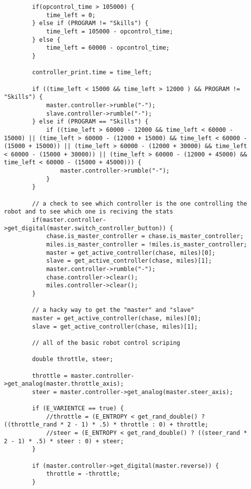 \begin{verbatim}
        if(opcontrol_time > 105000) {
            time_left = 0;
        } else if (PROGRAM != "Skills") {
            time_left = 105000 - opcontrol_time;
        } else {
            time_left = 60000 - opcontrol_time;
        }

        controller_print.time = time_left;

        if ((time_left < 15000 && time_left > 12000 ) && PROGRAM != "Skills") {
            master.controller->rumble("-");
            slave.controller->rumble("-");
        } else if (PROGRAM == "Skills") {
            if ((time_left > 60000 - 12000 && time_left < 60000 - 15000) || (time_left > 60000 - (12000 + 15000) && time_left < 60000 - (15000 + 15000)) || (time_left > 60000 - (12000 + 30000) && time_left < 60000 - (15000 + 30000)) || (time_left > 60000 - (12000 + 45000) && time_left < 60000 - (15000 + 45000))) {
                master.controller->rumble("-");
            }
        }

        // a check to see which controller is the one controlling the robot and to see which one is reciving the stats
        if(master.controller->get_digital(master.switch_controller_button)) {
            chase.is_master_controller = chase.is_master_controller;
            miles.is_master_controller = !miles.is_master_controller;
            master = get_active_controller(chase, miles)[0];
            slave = get_active_controller(chase, miles)[1];
            master.controller->rumble("-");
            chase.controller->clear();
            miles.controller->clear();
        }

        // a hacky way to get the "master" and "slave"
        master = get_active_controller(chase, miles)[0];
        slave = get_active_controller(chase, miles)[1];

        // all of the basic robot control scriping

        double throttle, steer;

        throttle = master.controller->get_analog(master.throttle_axis);
        steer = master.controller->get_analog(master.steer_axis);

        if (E_VARIENTCE == true) {
            //throttle = (E_ENTROPY < get_rand_double() ? ((throttle_rand * 2 - 1) * .5) * throttle : 0) + throttle;
            //steer = (E_ENTROPY < get_rand_double() ? ((steer_rand * 2 - 1) * .5) * steer : 0) + steer;
        }

        if (master.controller->get_digital(master.reverse)) {
            throttle = -throttle;
        }


\end{verbatim}
